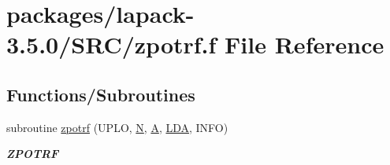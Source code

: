 \hypertarget{zpotrf_8f}{}\section{packages/lapack-\/3.5.0/\+S\+R\+C/zpotrf.f File Reference}
\label{zpotrf_8f}
\subsection*{Functions/\+Subroutines}
\begin{DoxyCompactItemize}
\item 
subroutine \hyperlink{group__complex16POcomputational_ga93e22b682170873efb50df5a79c5e4eb}{zpotrf} (U\+P\+L\+O, \hyperlink{polmisc_8c_a0240ac851181b84ac374872dc5434ee4}{N}, \hyperlink{classA}{A}, \hyperlink{example__user_8c_ae946da542ce0db94dced19b2ecefd1aa}{L\+D\+A}, I\+N\+F\+O)
\begin{DoxyCompactList}\small\item\em {\bfseries Z\+P\+O\+T\+R\+F} \end{DoxyCompactList}\end{DoxyCompactItemize}
